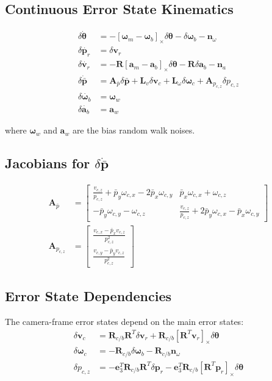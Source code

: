 \documentclass[11pt,a4paper]{article}
\newcommand{\pr}{\mathbf{p}_r}
\newcommand{\vr}{\mathbf{v}_r}
\newcommand{\pbar}{\bar{\mathbf{p}}}
\newcommand{\bgyr}{\bm{\omega}_b}
\newcommand{\bacc}{\mathbf{a}_b}
\newcommand{\R}{\mathbf{R}}
\renewcommand{\skew}[1]{\left[#1\right]_\times}
\begin{document}
\subsection{Continuous Error State Kinematics}
\begin{align}
    \delta\dot{\bm{\theta}} &= -\skew{\bm{\omega}_m - \bgyr} \delta\bm{\theta} - \delta\bgyr - \mathbf{n}_\omega \label{eq:dtheta_dot}\\[8pt]
    \delta\dot{\pr} &= \delta\vr \label{eq:dpr_dot}\\[8pt]
    \delta\dot{\vr} &= -\R \skew{\mathbf{a}_m - \bacc} \delta\bm{\theta} - \R \delta\bacc - \mathbf{n}_a \label{eq:dvr_dot}\\[8pt]
    \delta\dot{\pbar} &= \mathbf{A}_{\bar{p}} \delta\pbar + \mathbf{L}_v \delta\mathbf{v}_c + \mathbf{L}_\omega \delta\bm{\omega}_c + \mathbf{A}_{p_{c,z}} \delta p_{c,z} \label{eq:dpbar_dot}\\[8pt]
    \delta\dot{\bgyr} &= \bm{\omega}_w \label{eq:dbgyr_dot}\\[8pt]
    \delta\dot{\bacc} &= \mathbf{a}_w \label{eq:dbacc_dot}
\end{align}

where $\bm{\omega}_w$ and $\mathbf{a}_w$ are the bias random walk noises.

\subsection{Jacobians for $\delta\dot{\pbar}$}
\begin{align}
    \mathbf{A}_{\bar{p}} &= \begin{bmatrix}
        \frac{v_{c,z}}{p_{c,z}} + \bar{p}_y \omega_{c,x} - 2\bar{p}_x \omega_{c,y} & \bar{p}_x \omega_{c,x} + \omega_{c,z} \\[4pt]
        -\bar{p}_y \omega_{c,y} - \omega_{c,z} & \frac{v_{c,z}}{p_{c,z}} + 2\bar{p}_y \omega_{c,x} - \bar{p}_x \omega_{c,y}
    \end{bmatrix} \\[10pt]
    \mathbf{A}_{p_{c,z}} &= \begin{bmatrix}
        \frac{v_{c,x} - \bar{p}_x v_{c,z}}{p_{c,z}^2} \\[4pt]
        \frac{v_{c,y} - \bar{p}_y v_{c,z}}{p_{c,z}^2}
    \end{bmatrix}
\end{align}

\subsection{Error State Dependencies}
The camera-frame error states depend on the main error states:
\begin{align}
    \delta\mathbf{v}_c &= \R_{c/b} \R^T \delta\vr + \R_{c/b} \skew{\R^T \vr} \delta\bm{\theta} \\[6pt]
    \delta\bm{\omega}_c &= -\R_{c/b} \delta\bgyr - \R_{c/b} \mathbf{n}_\omega \\[6pt]
    \delta p_{c,z} &= -\mathbf{e}_3^T \R_{c/b} \R^T \delta\pr - \mathbf{e}_3^T \R_{c/b} \skew{\R^T \pr} \delta\bm{\theta}
\end{align}
\end{document}
